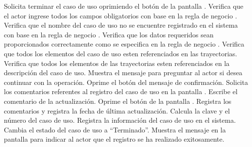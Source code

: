 \begin{UCtrayectoria}
    \UCpaso[\UCactor] Solicita terminar el caso de uso oprimiendo el botón  de la pantalla .    
    \UCpaso[\UCsist] Verifica que el actor ingrese todos los campos obligatorios con base en la regla de negocio  . 
    \UCpaso[\UCsist] Verifica que el nombre del caso de uso no se encuentre registrado en el sistema con base en la regla de negocio  . 
    \UCpaso[\UCsist] Verifica que los datos requeridos sean proporcionados correctamente como se especifica en la regla de negocio .  
    \UCpaso[\UCsist] Verifica que todos los elementos del caso de uso esten referenciados en las trayectorias. 
    \UCpaso[\UCsist] Verifica que todos los elementos de las trayectorias esten referenciados en la descripción del caso de uso. 
    \UCpaso[\UCsist] Muestra el mensaje  para preguntar al actor si desea continuar con la operación.
    \UCpaso[\UCactor] Oprime el botón  del mensaje de confirmación. 
    \UCpaso[\UCsist] Solicita los comentarios referentes al registro del caso de uso en la pantalla .
    \UCpaso[\UCactor] Escribe el comentario de la actualización.
    \UCpaso[\UCactor] Oprime el botón  de la pantalla . 
    \UCpaso[\UCsist] Registra los comentarios y registra la fecha de última actualización.
    \UCpaso[\UCsist] Calcula la clave y el número del caso de uso.
    \UCpaso[\UCsist] Registra la información del caso de uso en el sistema.
    \UCpaso[\UCsist] Cambia el estado del caso de uso a ``Terminado''.
    \UCpaso[\UCsist] Muestra el mensaje  en la pantalla  
    para indicar al actor que el registro se ha realizado exitosamente.
 \end{UCtrayectoria}
 

